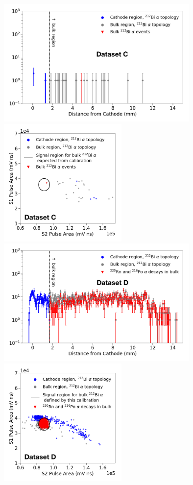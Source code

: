 \begin{figure}
\centering
\includegraphics[height=2.5in]{figures/radon/hist_bkg.png} \includegraphics[height=2.5in]{figures/radon/signalregion_bkg.png}\\
\includegraphics[height=2.5in]{figures/radon/hist_calib.png} \includegraphics[height=2.5in]{figures/radon/signalregion_calib.png}

\end{figure}
